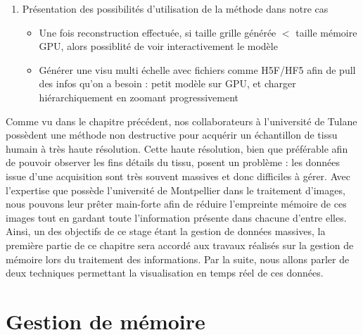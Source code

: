 {{\begin{enumerate}
\begin{itemize}
\begin{itemize}
				\end{itemize}
			\end{itemize}
			\item Présentation des possibilités d'utilisation de la méthode dans notre cas~\begin{itemize}
				\item Une fois reconstruction effectuée, si taille grille générée $<$ taille mémoire GPU, alors possiblité de voir interactivement le modèle
				\item Générer une visu multi échelle avec fichiers comme H5F/HF5 afin de pull des infos qu'on a besoin : petit modèle sur GPU, et charger hiérarchiquement en zoomant progressivement
			\end{itemize}
		\end{enumerate}
	}

	Comme vu dans le chapitre précédent, nos collaborateurs à l'université de Tulane possèdent une méthode non destructive pour acquérir un échantillon de tissu humain à très haute résolution. Cette haute résolution, bien que préférable afin de pouvoir observer les fins détails du tissu, posent un problème : les données issue d'une acquisition sont très souvent massives et donc difficiles à gérer. Avec l'expertise que possède l'université de Montpellier dans le traitement d'images, nous pouvons leur prêter main-forte afin de réduire l'empreinte mémoire de ces images tout en gardant toute l'information présente dans chacune d'entre elles. Ainsi, un des objectifs de ce stage étant la gestion de données massives, la première partie de ce chapitre sera accordé aux travaux réalisés sur la gestion de mémoire lors du traitement des informations. Par la suite, nous allons parler de deux techniques permettant la visualisation en temps réel de ces données.

	\section{Gestion de mémoire}
	{
		\\

		\\

}}
